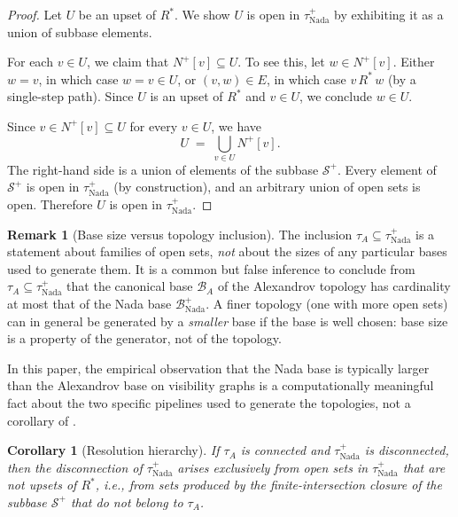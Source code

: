 \documentclass[11pt,a4paper]{article}
\theoremstyle{plain}
\newtheorem{corollary}[theorem]{Corollary}
\theoremstyle{definition}
\newtheorem{remark}[theorem]{Remark}
\newcommand{\Nfwd}[1]{N^{+}[#1]}
\newcommand{\taufwd}{\tau^{+}}
\newcommand{\subbase}{\mathcal{S}}
\newcommand{\base}{\mathcal{B}}
\begin{document}
\begin{proof}
Let $U$ be an upset of $R^*$.  We show $U$ is open in $\taufwd_{\mathrm{Nada}}$
by exhibiting it as a union of subbase elements.

For each $v \in U$, we claim that $\Nfwd{v} \subseteq U$.  To see this,
let $w \in \Nfwd{v}$.  Either $w = v$, in which case $w = v \in U$, or
$(v, w) \in E$, in which case $v \,R^*\, w$ (by a single-step path).  Since
$U$ is an upset of $R^*$ and $v \in U$, we conclude $w \in U$.

Since $v \in \Nfwd{v} \subseteq U$ for every $v \in U$, we have
\[
  U \;=\; \bigcup_{v \in U} \Nfwd{v}.
\]
The right-hand side is a union of elements of the subbase $\subbase^{+}$.
Every element of $\subbase^{+}$ is open in $\taufwd_{\mathrm{Nada}}$ (by
construction), and an arbitrary union of open sets is open.  Therefore $U$ is
open in $\taufwd_{\mathrm{Nada}}$.
\end{proof}

\begin{remark}[Base size versus topology inclusion]%
\label{rem:base-size-warning}
The inclusion $\tau_A \subseteq \taufwd_{\mathrm{Nada}}$ is a statement
about families of open sets, \emph{not} about the sizes of any
particular bases used to generate them.  It is a common but false
inference to conclude from $\tau_A \subseteq \taufwd_{\mathrm{Nada}}$
that the canonical base $\base_A$ of the Alexandrov topology has
cardinality at most that of the Nada base $\base^{+}_{\mathrm{Nada}}$.
A finer topology (one with more open sets) can in general be generated
by a \emph{smaller} base if the base is well chosen: base size is a
property of the generator, not of the topology.

In this paper, the empirical observation that the Nada base is typically
larger than the Alexandrov base on visibility graphs is a
computationally meaningful fact about the two specific pipelines used
to generate the topologies, not a corollary of
.
\end{remark}


\begin{corollary}[Resolution hierarchy]%
\label{cor:resolution-hierarchy}
If $\tau_A$ is connected and $\taufwd_{\mathrm{Nada}}$ is disconnected, then
the disconnection of $\taufwd_{\mathrm{Nada}}$ arises exclusively from open
sets in $\taufwd_{\mathrm{Nada}}$ that are not upsets of $R^*$, i.e., from
sets produced by the finite-intersection closure of the subbase $\subbase^{+}$
that do not belong to $\tau_A$.
\end{corollary}
\end{document}
